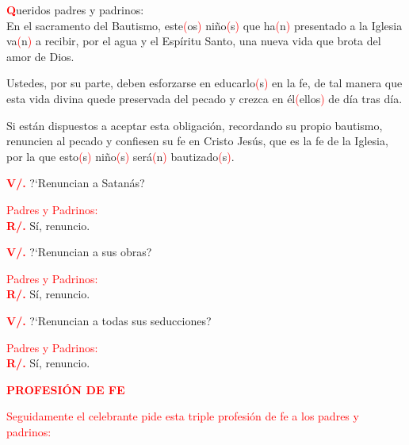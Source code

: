 \documentclass[12pt, letterpaper, spanish]{article}
\begin{document}
  \lettrine[lines=2]{\bfseries \textcolor{red}{Q}}{}\Large ueridos padres y padrinos: \\ En el sacramento del Bautismo, este\textcolor{red}{(}os\textcolor{red}{)} ni\~no\textcolor{red}{(}s\textcolor{red}{)} que ha\textcolor{red}{(}n\textcolor{red}{)} presentado a la Iglesia va\textcolor{red}{(}n\textcolor{red}{)} a recibir, por el agua y el Esp\'iritu Santo, una nueva vida que brota del amor de Dios.

  \noindent
  Ustedes, por su parte, deben esforzarse en educarlo\textcolor{red}{(}s\textcolor{red}{)} en la fe, de tal manera que esta vida divina quede preservada del pecado y crezca en \'el\textcolor{red}{(}ellos\textcolor{red}{)} de d\'ia tras d\'ia.

  \noindent
  Si est\'an dispuestos a aceptar esta obligaci\'on, recordando su propio bautismo, renuncien al pecado y confiesen su fe en Cristo Jes\'us, que es la fe de la Iglesia, por la que esto\textcolor{red}{(}s\textcolor{red}{)} ni\~no\textcolor{red}{(}s\textcolor{red}{)} ser\'a\textcolor{red}{(}n\textcolor{red}{)} bautizado\textcolor{red}{(}s\textcolor{red}{)}.

  \noindent
  \Large {\bfseries \textcolor{red}{V/.}} \hspace{0.5cm} ?`Renuncian a Satan\'as?

  \large {\textcolor{red}{Padres y Padrinos:}}\\
  \Large {\bfseries \textcolor{red}{R/.}} \hspace{0.5cm} S\'i, renuncio. 

  \noindent
  \Large {\bfseries \textcolor{red}{V/.}} \hspace{0.5cm} ?`Renuncian a sus obras?

  \large {\textcolor{red}{Padres y Padrinos:}}\\
  \Large {\bfseries \textcolor{red}{R/.}} \hspace{0.5cm} S\'i, renuncio. 

  \noindent
  \Large {\bfseries \textcolor{red}{V/.}} \hspace{0.5cm} ?`Renuncian a todas sus seducciones?

  \large {\textcolor{red}{Padres y Padrinos:}}\\
  \Large {\bfseries \textcolor{red}{R/.}} \hspace{0.5cm} S\'i, renuncio. 

  \Large {\bfseries \textcolor{red}{PROFESI\'ON DE FE}} 

  \large {\textcolor{red}{Seguidamente el celebrante pide esta triple profesi\'on de fe a los padres y padrinos:}} 
\end{document}
